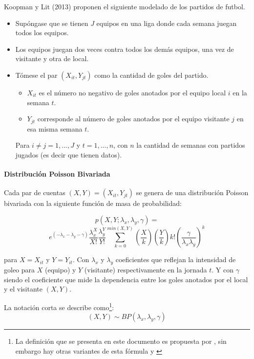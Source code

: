 Koopman y Lit (2013) \cite{koopman2013dynamic} proponen el siguiente modelado de los partidos de futbol.
\begin{itemize}

	\item Supóngase que se tienen $J$ equipos en una liga donde cada semana juegan todos los equipos.

	\item Los equipos juegan dos veces contra todos los demás equipos, una vez de visitante y otra de local.
	\item Tómese el par $(X_{it},Y_{jt})$ como la cantidad de goles del partido. 
	\begin{itemize}
	
		\item $X_{it}$ es el número no negativo de goles anotados por el equipo local $i$ en la semana $t$.
		\item $Y_{jt}$ corresponde al número de goles anotados por el equipo visitante $j$ en esa misma semana $t$.
	\end{itemize}
		
		Para $i\neq j = 1, ...,J$ y $t=1,...,n$, con $n$ la cantidad de semanas con partidos jugados (es decir que tienen datos).
\end{itemize}

\paragraph{Distribución Poisson Bivariada} %
\label{par:distribucion_poisson_bivariada}
Cada par de cuentas $(X,Y) = (X_{it},Y_{jt})$ se genera de una distribución Poisson bivariada con la siguiente función de masa de probabilidad:
 
 \[p(X,Y;\lambda_x,\lambda_y,\gamma) =\]
  \[e^{(-\lambda_x-\lambda_y-\gamma)}\frac{\lambda^X_x}{X!}\frac{\lambda^Y_y}{Y!}\sum_{k=0}^{min(X,Y)}\left(\frac{X}{k}\right)\left(\frac{Y}{k}\right)k!\left(\frac{\gamma}{\lambda_x\lambda_y}\right)^k \]

 para $X = X_{it}$ y $Y = Y_{it}$.
 Con $\lambda_x$ y $\lambda_y$ coeficientes que reflejan la intensidad de goleo para $X$ (equipo) y $Y$ (visitante) respectivamente en la jornada $t$.
 Y con $\gamma$ siendo el coeficiente que mide la dependencia entre los goles anotados por el local y el visitante $(X,Y)$. 

 La notación corta se describe como\footnote{La definición que se presenta en este documento es propuesta por \cite{koopman2013dynamic}, sin embargo hay otras variantes de esta fórmula \cite{kocherlakota1992bivariate} y \cite{johnson1997discrete}}:
 \boldmath\[(X,Y) \sim BP(\lambda_x,\lambda_y,\gamma)\]\unboldmath 
 

